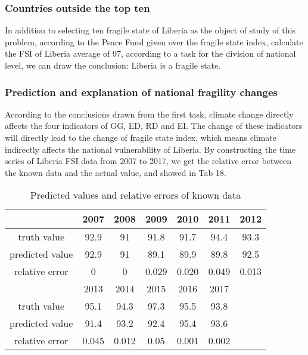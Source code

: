 \documentclass{mcmthesis}
\begin{document}
\subsubsection{Countries outside the top ten}
In addition to selecting ten fragile state of Liberia as the object of study of this problem, according to the Peace Fund given over the fragile state index, calculate the FSI of Liberia average of 97, according to a task for the division of national level, we can draw the conclusion: Liberia is a fragile state.
\subsubsection{Prediction and explanation of national fragility changes}
According to the conclusions drawn from the first task, climate change directly affects the four indicators of GG, ED, RD and EI. The change of these indicators will directly lead to the change of fragile state index, which means climate indirectly affects the national vulnerability of Liberia.
By constructing the time series of Liberia FSI data from 2007 to 2017, we get the relative error between the known data and the actual value, and showed in Tab 18.

\begin{table}[htbp]
\centering
\caption{Predicted values and relative errors of known data}
\begin{tabular}{c|c|c|c|c|c|c}   %
\hline
& 2007	&2008	&2009	&2010	&2011	&2012	\\
\hline 
truth value &92.9	&91	&91.8	&91.7	&94.4	&93.3\\

\hline
predicted value &92.9 &	91	&89.1	&89.9	&89.8	&92.5\\

\hline
relative error &  0 & 0 &0.029&0.020&0.049&0.013\\
\hline

\hline
\hline
  & 2013	&2014	&2015	&2016	&2017	\\
\hline
truth value &95.1	&94.3	&97.3	&95.5	&93.8\\

\hline
predicted value &91.4	&93.2	&92.4	&95.4	&93.6\\

\hline
relative error&0.045& 	0.012 &	0.05  &	0.001  &	0.002\\
\hline
\hline
\end{tabular}
\end{table}
\end{document}
